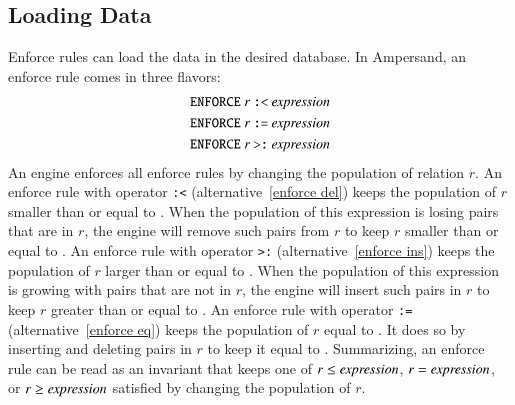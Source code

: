 \documentclass{elsarticle}
\begin{document}
\subsection{Loading Data}
   Enforce rules can load the data in the desired database.
   In Ampersand, an enforce rule comes in three flavors:
\begin{eqnarray}
   \text{\tt ENFORCE}\ r\ \text{\tt :<}\ \id{expression}\label{enforce del}\\
   \text{\tt ENFORCE}\ r\ \text{\tt :=}\ \id{expression}\label{enforce eq}\\
   \text{\tt ENFORCE}\ r\ \text{\tt >:}\ \id{expression}\label{enforce ins}
\end{eqnarray}
   An engine enforces all enforce rules by changing the population of relation $r$.
   An enforce rule with operator {\tt :<} (alternative~\ref{enforce del}) keeps the population of $r$ smaller than or equal to .
   When the population of this expression is losing pairs that are in $r$, the engine will remove such pairs from $r$ to keep $r$ smaller than or equal to .
   An enforce rule with operator {\tt >:} (alternative~\ref{enforce ins}) keeps the population of $r$ larger than or equal to .
   When the population of this expression is growing with pairs that are not in $r$, the engine will insert such pairs in $r$ to keep $r$ greater than or equal to .
   An enforce rule with operator {\tt :=} (alternative~\ref{enforce eq}) keeps the population of $r$ equal to .
   It does so by inserting and deleting pairs in $r$ to keep it equal to .
   Summarizing, an enforce rule can be read as an invariant that keeps one of $r\leq\text{\it expression\/}$, $r=\text{\it expression\/}$, or $r\geq\text{\it expression\/}$ satisfied by changing the population of $r$.
\end{document}
